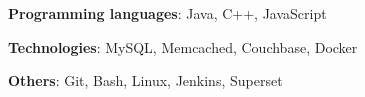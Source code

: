 \begin{cvempty} %
    \begin{cvitems} %
        \item{\textbf{Programming languages}: Java, C++, JavaScript}
        \item{\textbf{Technologies}: MySQL, Memcached, Couchbase, Docker}
        \item{\textbf{Others}: Git, Bash, Linux, Jenkins, Superset}
    \end{cvitems}
\end{cvempty}
